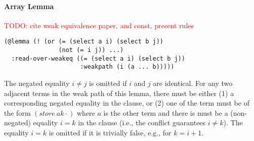 \documentclass[a4paper]{article}
\newcommand\todo[1]{\textcolor{red}{TODO: #1}}
\begin{document}
\paragraph{Array Lemma}
\todo{cite weak equivalence paper, and const, present rules}

\begin{verbatim}
(@lemma (! (or (= (select a i) (select b j))
               (not (= i j)) ...)
  :read-over-weakeq ((= (select a i) (select b j))
                     :weakpath (i (a ... b)))))
\end{verbatim}
The negated equality $i\neq j$ is omitted if $i$ and $j$ are identical.
For any two adjacent terms in the weak path of this lemma, there must be either
(1) a corresponding negated equality in the clause, or (2) one of the term must be of
the form $(store\ a k \cdot)$ where $a$ is the other term and there is must be
a (non-negated) equality $i=k$ in the clause (i.e., the conflict guarantees $i\neq k$).
The equality $i=k$ is omitted if it is trivially false, e.g., for $k = i+1$.
\end{document}
